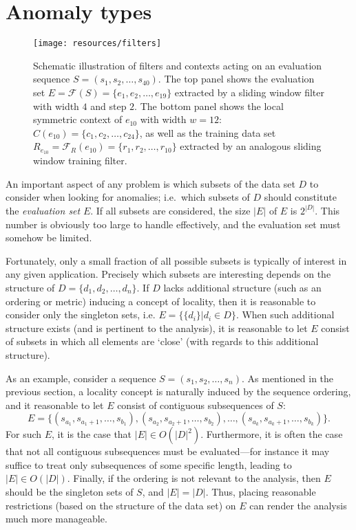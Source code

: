 \section{Anomaly types}
\label{sect:anomaly_types}

\begin{figure}[htb]
    \begin{center}
        \texttt{[image: resources/filters]}
    \end{center}
    \caption{{\small Schematic illustration of filters and contexts acting on an evaluation sequence $S = (s_1, s_2, \dots, s_{40})$. The top panel shows the evaluation set $E = \mathcal{F}(S) = \{e_1, e_2, \dots, e_{19}\}$ extracted by a sliding window filter with width $4$ and step $2$. The bottom panel shows the local symmetric context of $e_{10}$ with width $w = 12$: $C(e_{10}) = \{c_1, c_2, \dots, c_{24}\}$, as well as the training data set $R_{e_{10}} = \mathcal{F}_R(e_{10}) = \{r_1, r_2, \dots, r_{10}\}$ extracted by an analogous sliding window training filter.}}
\label{fig:filters}
\end{figure}

An important aspect of any problem is which subsets of the data set $D$ to consider when looking for anomalies; i.e.\ which subsets of $D$ should constitute the \emph{evaluation set} $E$. If all subsets are considered, the size $|E|$ of $E$ is $2^{|D|}$. This number is obviously too large to handle effectively, and the evaluation set must somehow be limited.

Fortunately, only a small fraction of all possible subsets is typically of interest in any given application. Precisely which subsets are interesting depends on the structure of $D = \{d_1, d_2, \dots, d_n\}$. If $D$ lacks additional structure (such as an ordering or metric) inducing a concept of locality, then it is reasonable to consider only the singleton sets, i.e. $E = \{\{d_i\} | d_i \in D\}$. When such additional structure exists (and is pertinent to the analysis), it is reasonable to let $E$ consist of subsets in which all elements are `close' (with regards to this additional structure).

As an example, consider a sequence $S = (s_1, s_2, \dots, s_n)$. As mentioned in the previous section, a locality concept is naturally induced by the sequence ordering, and it reasonable to let $E$ consist of contiguous subsequences of $S$:
\[
    E = \{(s_{a_1}, s_{a_1 + 1}, \dots , s_{b_1}) , (s_{a_2}, s_{a_2 +1}, \dots, s_{b_2}), \dots, (s_{a_k}, s_{a_k+1}, \dots, s_{b_k})\}.
\]
For such $E$, it is the case that $|E| \in O(|D|^2)$. Furthermore, it is often the case that not all contiguous subsequences must be evaluated---for instance it may suffice to treat only subsequences of some specific length, leading to $|E| \in O(|D|)$. Finally, if the ordering is not relevant to the analysis, then $E$ should be the singleton sets of $S$, and $|E| = |D|$. Thus, placing reasonable restrictions (based on the structure of the data set) on $E$ can render the analysis much more manageable.


